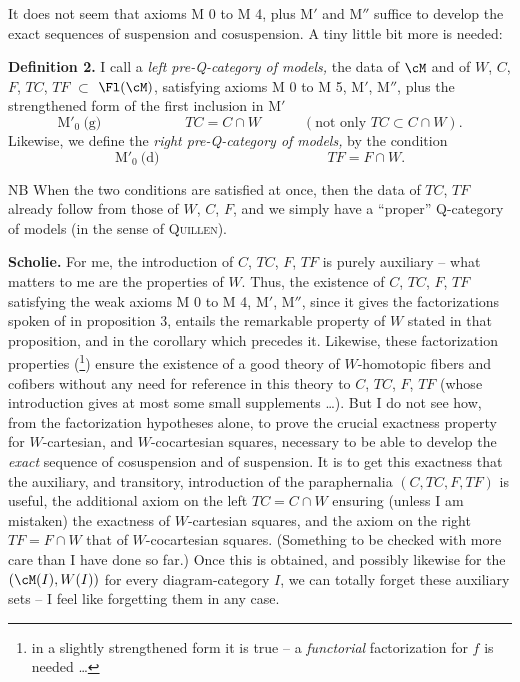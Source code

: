 It does not seem that axioms M 0 to M 4, plus M$'$ and M$''$ suffice to develop the exact sequences of suspension and cosuspension. A tiny little bit more is needed:

\textbf{Definition 2.} I call a \textit{left pre-Q-category of models,} the data of $\cM$ and of $W$, $C$, $F$, $TC$, $TF$ $\subset$ $\Fl(\cM)$, satisfying axioms M 0 to M 5, M$'$, M$''$, plus the strengthened form of the first inclusion in M$'$
\[
\text{M}'_0\ \text{(g)}\qquad\qquad\qquad TC=C\cap W\qquad\quad(\text{not only } TC\subset C\cap W).
\]
Likewise, we define the \textit{right pre-Q-category of models,} by the condition
\[
\text{M}'_0\ \text{(d)}\qquad\qquad\qquad\qquad\qquad\qquad TF=F\cap W.
\]

NB When the two conditions are satisfied at once, then the data of $TC$, $TF$ already follow from those of $W$, $C$, $F$, and we simply have a ``proper'' Q-category of models (in the sense of \textsc{Quillen}).

\textbf{Scholie.} For me, the introduction of $C$, $TC$, $F$, $TF$ is purely auxiliary – what matters to me are the properties of $W$. Thus, the existence of $C$, $TC$, $F$, $TF$ satisfying the weak axioms M 0 to M 4, M$'$, M$''$, since it gives the factorizations
spoken of in proposition 3, entails the remarkable property of $W$ stated in that proposition, and in the corollary which precedes it. Likewise, these factorization properties (\footnote{in a slightly strengthened form it is true – a \textit{functorial} factorization for $f$ is needed \dots}) ensure the existence of a good theory of $W$-homotopic fibers and cofibers without any need for reference in this theory to $C$, $TC$, $F$, $TF$ (whose introduction gives at most some small supplements \dots). But I do not see how, from the factorization hypotheses alone, to prove the crucial exactness property for $W$-cartesian, and $W$-cocartesian squares, necessary to be able to develop the \textit{exact} sequence of cosuspension and of suspension. It is to get this exactness that the auxiliary, and transitory, introduction of the paraphernalia $(C,TC,F,TF)$ is useful, the additional axiom on the left $TC=C\cap W$ ensuring (unless I am mistaken) the exactness of $W$-cartesian squares, and the axiom on the right $TF=F\cap W$ that of $W$-cocartesian squares. (Something to be checked with more care than I have done so far.) Once this is obtained, and possibly likewise for the $(\cM(I),W(I))$ for every diagram-category $I$, we can
totally forget these auxiliary sets – I feel like forgetting them in any case.

